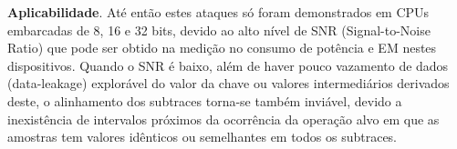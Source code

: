 \noindent \textbf{Aplicabilidade}. Até então estes ataques só foram demonstrados em CPUs embarcadas de 8, 16 e 32 bits, devido ao alto nível de SNR (Signal-to-Noise Ratio) que pode ser obtido na medição no consumo de potência e EM nestes dispositivos. Quando o SNR é baixo, além de haver pouco vazamento de dados (data-leakage) explorável do valor da chave ou valores intermediários derivados deste, o alinhamento dos subtraces torna-se também inviável, devido a inexistência de intervalos próximos da ocorrência da operação alvo em que as amostras tem valores idênticos ou semelhantes em todos os subtraces.
